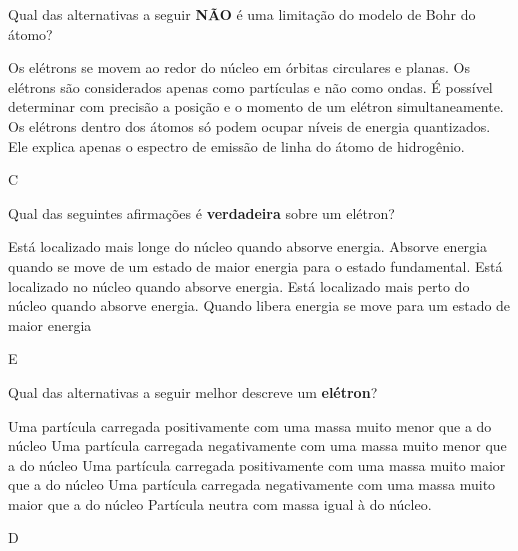 \documentclass[9qpt]{scrartcl}
\begin{document}
\begin{exercise}[points=1.0]
Qual das alternativas a seguir \textbf{NÃO} é uma limitação do modelo de Bohr do átomo?

\begin{choice}
\choice Os elétrons se movem ao redor do núcleo em órbitas circulares e planas.
\choice Os elétrons são considerados apenas como partículas e não como ondas.
\choice É possível determinar com precisão a posição e o momento de um elétron simultaneamente.
\choice Os elétrons dentro dos átomos só podem ocupar níveis de energia quantizados.
\choice Ele explica apenas o espectro de emissão de linha do átomo de hidrogênio.
\end{choice}
\end{exercise}
\begin{solution}
C
\end{solution}



\begin{exercise}[points=1.0]
Qual das seguintes afirmações é \textbf{verdadeira} sobre um elétron?

\begin{choice}
\choice Está localizado mais longe do núcleo quando absorve energia.
\choice Absorve energia quando se move de um estado de maior energia para o estado fundamental.
\choice Está localizado no núcleo quando absorve energia.
\choice Está localizado mais perto do núcleo quando absorve energia.
\choice Quando libera energia se move para um estado de maior energia
\end{choice}
\end{exercise}
\begin{solution}
E
\end{solution}



\begin{exercise}[points=1.0]
Qual das alternativas a seguir melhor descreve um \textbf{elétron}?
\begin{choice}
\choice Uma partícula carregada positivamente com uma massa muito menor que a do núcleo
\choice Uma partícula carregada negativamente com uma massa muito menor que a do núcleo
\choice Uma partícula carregada positivamente com uma massa muito maior que a do núcleo
\choice Uma partícula carregada negativamente com uma massa muito maior que a do núcleo
\choice Partícula neutra com massa igual à do núcleo.
\end{choice}
\end{exercise}
\begin{solution}
D
\end{solution}
\end{document}

